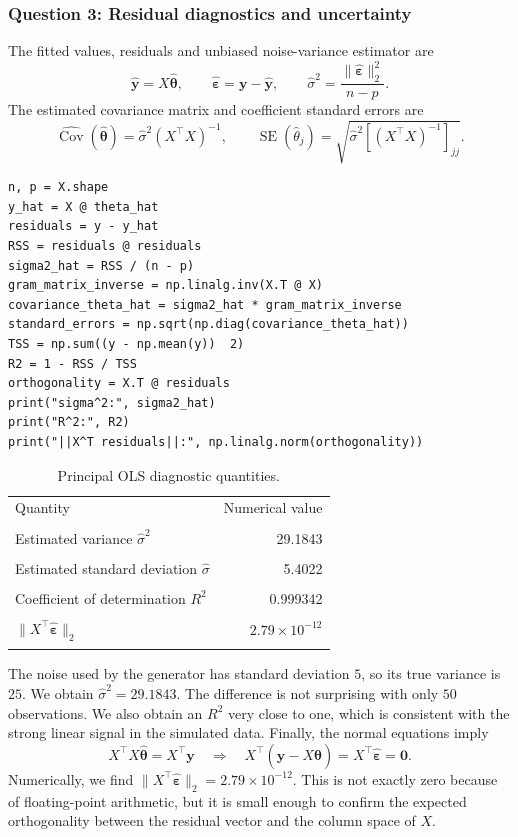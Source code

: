 \documentclass[11pt,a4paper]{article}
\newcommand{\thetahat}{\widehat{\bm\theta}}
\newcommand{\epshat}{\widehat{\bm\varepsilon}}
\begin{document}
\subsubsection{Question 3: Residual diagnostics and uncertainty}
The fitted values, residuals and unbiased noise-variance estimator are
\[
    \widehat{\bm y}=X\thetahat,
    \qquad
    \epshat=\bm y-\widehat{\bm y},
    \qquad
    \widehat\sigma^2=\frac{\|\epshat\|_2^2}{n-p}.
\]
The estimated covariance matrix and coefficient standard errors are
\[
    \widehat{\operatorname{Cov}}(\thetahat)
    =\widehat\sigma^2(X^\top X)^{-1},
    \qquad
    \operatorname{SE}(\widehat\theta_j)
    =\sqrt{\widehat\sigma^2[(X^\top X)^{-1}]_{jj}}.
\]
\begin{lstlisting}[caption={Residuals, variance estimate, standard errors and coefficient of determination.}]
n, p = X.shape
y_hat = X @ theta_hat
residuals = y - y_hat
RSS = residuals @ residuals
sigma2_hat = RSS / (n - p)
gram_matrix_inverse = np.linalg.inv(X.T @ X)
covariance_theta_hat = sigma2_hat * gram_matrix_inverse
standard_errors = np.sqrt(np.diag(covariance_theta_hat))
TSS = np.sum((y - np.mean(y))  2)
R2 = 1 - RSS / TSS
orthogonality = X.T @ residuals
print("sigma^2:", sigma2_hat)
print("R^2:", R2)
print("||X^T residuals||:", np.linalg.norm(orthogonality))
\end{lstlisting}
\begin{table}[H]
    \centering
    \caption{Principal OLS diagnostic quantities.}
    \label{tab:ols-results}
    \renewcommand{\arraystretch}{1.15}
    \begin{tabular}{lr}
        \toprule
        Quantity & Numerical value \\\\
        \midrule
        Estimated variance $\widehat\sigma^2$ & 29.1843 \\\\
        Estimated standard deviation $\widehat\sigma$ & 5.4022 \\\\
        Coefficient of determination $R^2$ & 0.999342 \\\\
        $\|X^\top\epshat\|_2$ & $2.79\times10^{-12}$ \\\\
        \bottomrule
    \end{tabular}
\end{table}
The noise used by the generator has standard deviation $5$, so its true
variance is $25$. We obtain $\widehat\sigma^2=29.1843$. The difference is not
surprising with only $50$ observations. We also obtain an $R^2$ very close to
one, which is consistent with the strong linear signal in the simulated data.
Finally, the normal equations imply
\[
    X^\top X\thetahat=X^\top\bm y
    \quad\Longrightarrow\quad
    X^\top(\bm y-X\thetahat)=X^\top\epshat=\bm0.
\]
Numerically, we find $\|X^\top\epshat\|_2=2.79\times10^{-12}$. This is not
exactly zero because of floating-point arithmetic, but it is small enough to
confirm the expected orthogonality between the residual vector and the column
space of $X$.
\end{document}
